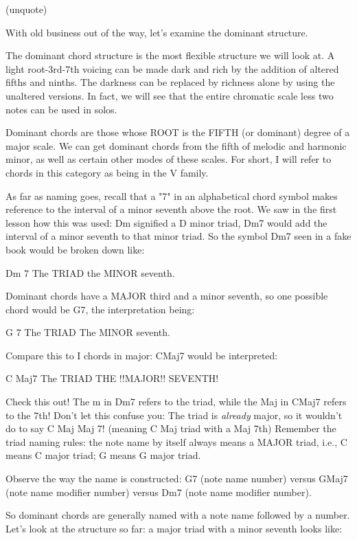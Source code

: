 (unquote)

With old business out of the way, let's examine the dominant structure.

The dominant chord structure is the most flexible structure we will look at.
A light root-3rd-7th voicing can be made dark and rich by the addition of
altered fifths and ninths. The darkness can be replaced by richness alone by
using the unaltered versions. In fact, we will see that the entire chromatic
scale less two notes can be used in solos.

Dominant chords are those whose ROOT is the FIFTH (or dominant) degree of
a major scale. We can get dominant chords from the fifth of melodic and
harmonic minor, as well as certain other modes of these scales. For short,
I will refer to chords in this category as being in the V family.

As far as naming goes, recall that a "7" in an alphabetical chord symbol
makes reference to the interval of a minor seventh above the root. We saw
in the first lesson how this was used: Dm signified a D minor triad, Dm7
would add the interval of a minor seventh to that minor triad. So the
symbol Dm7 seen in a fake book would be broken down like: 

          Dm                 7
      The TRIAD       the MINOR seventh.

Dominant chords have a MAJOR third and a minor seventh, so one possible
chord would be G7, the interpretation being:

         G                    7
    The TRIAD          The MINOR seventh.

Compare this to I chords in major: CMaj7 would be interpreted:

        C                Maj7
   The TRIAD         THE !!MAJOR!! SEVENTH!

Check this out! The m in Dm7 refers to the triad, while the Maj in CMaj7
refers to the 7th! Don't let this confuse you: The triad is \emph{already} 
major, so it wouldn't do to say C Maj Maj 7! (meaning C Maj triad with
a Maj 7th) Remember the triad naming rules: the note name by itself always
means a MAJOR triad, i.e., C means C major triad; G means G major triad.

Observe the way the name is constructed: G7 (note name   number) versus
GMaj7 (note name  modifier  number) versus Dm7 (note name  modifier  number).

So dominant chords are generally named with a note name followed by a number.
Let's look at the structure so far: a major triad with a minor seventh looks
like:

